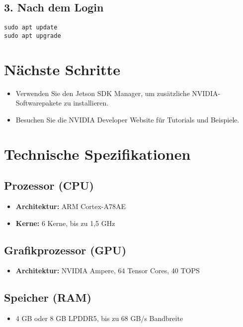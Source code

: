 \documentclass{article}
\begin{document}
\subsection{3. Nach dem Login}
\begin{verbatim}
sudo apt update
sudo apt upgrade
\end{verbatim}

\section{Nächste Schritte}
\begin{itemize}
    \item Verwenden Sie den Jetson SDK Manager, um zusätzliche NVIDIA-Softwarepakete zu installieren.
    \item Besuchen Sie die NVIDIA Developer Website für Tutorials und Beispiele.
\end{itemize}

\section{Technische Spezifikationen}

\subsection{Prozessor (CPU)}
\begin{itemize}
    \item \textbf{Architektur:} ARM Cortex-A78AE
    \item \textbf{Kerne:} 6 Kerne, bis zu 1,5 GHz
\end{itemize}

\subsection{Grafikprozessor (GPU)}
\begin{itemize}
    \item \textbf{Architektur:} NVIDIA Ampere, 64 Tensor Cores, 40 TOPS
\end{itemize}

\subsection{Speicher (RAM)}
\begin{itemize}
    \item 4 GB oder 8 GB LPDDR5, bis zu 68 GB/s Bandbreite
\end{itemize}
\end{document}
